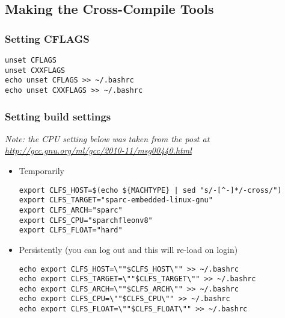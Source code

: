 \subsection{Making the Cross-Compile Tools}
 \subsubsection{Setting CFLAGS}
 \begin{lstlisting}
unset CFLAGS
unset CXXFLAGS
echo unset CFLAGS >> ~/.bashrc
echo unset CXXFLAGS >> ~/.bashrc
\end{lstlisting}
 \subsubsection{Setting build settings}
\emph{Note: the CPU setting below was taken from the post at
\url{http://gcc.gnu.org/ml/gcc/2010-11/msg00440.html}}
\begin{itemize}
\item Temporarily
  \begin{lstlisting}
export CLFS_HOST=$(echo ${MACHTYPE} | sed "s/-[^-]*/-cross/")
export CLFS_TARGET="sparc-embedded-linux-gnu"
export CLFS_ARCH="sparc"
export CLFS_CPU="sparchfleonv8"
export CLFS_FLOAT="hard"
  \end{lstlisting}
\item Persistently (you can log out and this will re-load on login)
  \begin{lstlisting}
echo export CLFS_HOST=\""$CLFS_HOST\"" >> ~/.bashrc
echo export CLFS_TARGET=\""$CLFS_TARGET\"" >> ~/.bashrc
echo export CLFS_ARCH=\""$CLFS_ARCH\"" >> ~/.bashrc
echo export CLFS_CPU=\""$CLFS_CPU\"" >> ~/.bashrc
echo export CLFS_FLOAT=\""$CLFS_FLOAT\"" >> ~/.bashrc
  \end{lstlisting}
\end{itemize}
